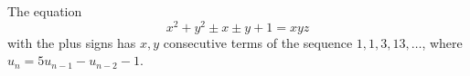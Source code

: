 \begin{proposition}
    The equation
\[
    x^2+y^2\pm x\pm y+1=xyz
\]
    with the plus signs has $x,y$ consecutive terms of the sequence $1,1,3,13,\ldots$, where $u_n=5u_{n-1}-u_{n-2}-1$.
\end{proposition}
